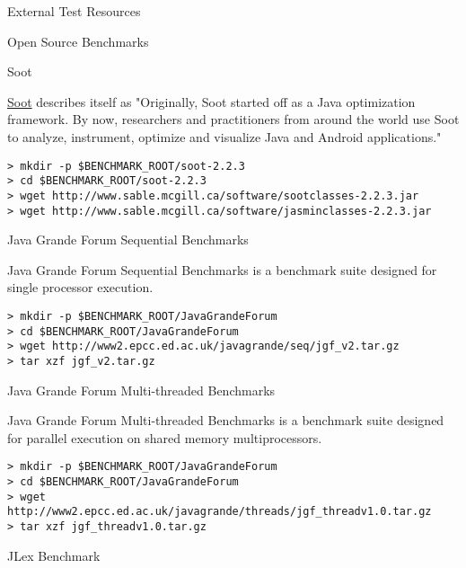 \begin{section}{External Test Resources}
\begin{subsection}{Open Source Benchmarks}
\begin{subsubsection}{Soot}

\href{http://sable.github.io/soot/}{Soot} describes itself as "Originally, Soot started off as a Java optimization framework. By now, researchers and practitioners from around the world use Soot to analyze, instrument, optimize and visualize Java and Android applications."

\begin{lstlisting}[breaklines=true, breakatwhitespace=false]
> mkdir -p $BENCHMARK_ROOT/soot-2.2.3
> cd $BENCHMARK_ROOT/soot-2.2.3
> wget http://www.sable.mcgill.ca/software/sootclasses-2.2.3.jar
> wget http://www.sable.mcgill.ca/software/jasminclasses-2.2.3.jar
\end{lstlisting}

\end{subsubsection}

\begin{subsubsection}{Java Grande Forum Sequential Benchmarks}

Java Grande Forum Sequential Benchmarks is a benchmark suite designed for single processor execution.

\begin{lstlisting}[breaklines=true, breakatwhitespace=false]
> mkdir -p $BENCHMARK_ROOT/JavaGrandeForum
> cd $BENCHMARK_ROOT/JavaGrandeForum
> wget http://www2.epcc.ed.ac.uk/javagrande/seq/jgf_v2.tar.gz
> tar xzf jgf_v2.tar.gz
\end{lstlisting}

\end{subsubsection}

\begin{subsubsection}{Java Grande Forum Multi-threaded Benchmarks}

Java Grande Forum Multi-threaded Benchmarks is a benchmark suite designed for parallel execution on shared memory multiprocessors.

\begin{lstlisting}[breaklines=true, breakatwhitespace=false]
> mkdir -p $BENCHMARK_ROOT/JavaGrandeForum
> cd $BENCHMARK_ROOT/JavaGrandeForum
> wget http://www2.epcc.ed.ac.uk/javagrande/threads/jgf_threadv1.0.tar.gz
> tar xzf jgf_threadv1.0.tar.gz
\end{lstlisting}

\end{subsubsection}

\begin{subsubsection}{JLex Benchmark}


\end{subsubsection}
\end{subsection}
\end{section}

